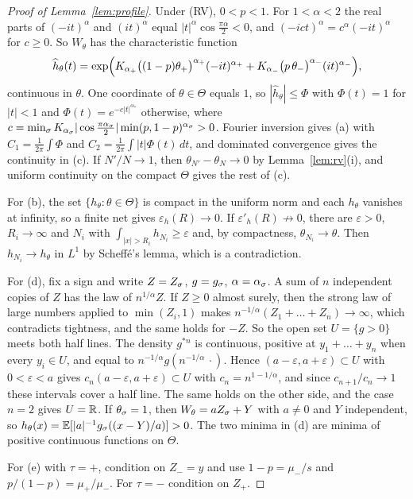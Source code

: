 \begin{proof}[Proof of Lemma~\ref{lem:profile}]
Under (RV), $0<p<1$. For $1<\alpha<2$ the real parts of $(-it)^\alpha$ and $(it)^\alpha$
equal $|t|^\alpha\cos\frac{\pi\alpha}2<0$, and $(-ict)^\alpha=c^\alpha(-it)^\alpha$ for $c\ge0$.
So $W_\theta$ has the characteristic function
\[
 \widehat h_\theta(t)=\exp\Bigl(K_{\alpha_{+}}\bigl((1-p)\theta_{+}\bigr)^{\alpha_{+}}(-it)^{\alpha_{+}}
 +K_{\alpha_{-}}\bigl(p\,\theta_{-}\bigr)^{\alpha_{-}}(it)^{\alpha_{-}}\Bigr),
\]
continuous in $\theta$. One coordinate of $\theta\in\Theta$ equals $1$, so
$|\widehat h_\theta|\le\Phi$ with $\Phi(t)=1$ for $|t|<1$ and $\Phi(t)=e^{-c|t|^{\alpha_*}}$
otherwise, where $c=\min_\sigma K_{\alpha_\sigma}|\cos\frac{\pi\alpha_\sigma}2|\min(p,1-p)^{\alpha_\sigma}>0$.
Fourier inversion gives (a) with $C_1=\frac1{2\pi}\int\Phi$ and
$C_2=\frac1{2\pi}\int|t|\Phi(t)\,dt$, and dominated convergence gives the continuity
in (c). If $N'/N\to1$, then $\theta_{N'}-\theta_N\to0$ by Lemma~\ref{lem:rv}(i), and
uniform continuity on the compact $\Theta$ gives the rest of (c).

For (b), the set $\{h_\theta:\theta\in\Theta\}$ is compact in the uniform norm and
each $h_\theta$ vanishes at infinity, so a finite net gives $\varepsilon_h(R)\to0$. If
$\varepsilon'_h(R)\not\to0$, there are $\varepsilon>0$, $R_i\to\infty$ and $N_i$ with
$\int_{|x|>R_i}h_{N_i}\ge\varepsilon$ and, by compactness, $\theta_{N_i}\to\theta$. Then
$h_{N_i}\to h_\theta$ in $L^1$ by Scheff\'e's lemma, which is a contradiction.

For (d), fix a sign and write $Z=Z_\sigma$, $g=g_\sigma$, $\alpha=\alpha_\sigma$. A sum of $n$
independent copies of $Z$ has the law of $n^{1/\alpha}Z$. If $Z\ge0$ almost surely,
then the strong law of large numbers applied to $\min(Z_i,1)$ makes
$n^{-1/\alpha}(Z_1+\dots+Z_n)\to\infty$, which contradicts tightness, and the same holds
for $-Z$. So the open set $U=\{g>0\}$ meets both half lines. The density $g^{*n}$ is
continuous, positive at $y_1+\dots+y_n$ when every $y_i\in U$, and equal to
$n^{-1/\alpha}g(n^{-1/\alpha}\,\cdot)$. Hence $(a-\varepsilon,a+\varepsilon)\subset U$ with
$0<\varepsilon<a$ gives $c_n(a-\varepsilon,a+\varepsilon)\subset U$ with
$c_n=n^{1-1/\alpha}$, and since $c_{n+1}/c_n\to1$ these intervals cover a half line. The
same holds on the other side, and the case $n=2$ gives $U=\mathbb{R}$. If $\theta_\sigma=1$, then
$W_\theta=aZ_\sigma+Y$ with $a\ne0$ and $Y$ independent, so $h_\theta(x)=\mathbb{E}[|a|^{-1}g_\sigma((x-Y)/a)]>0$.
The two minima in (d) are minima of positive continuous functions on $\Theta$.

For (e) with $\tau=\plus$, condition on $Z_\minus=y$ and use $1-p=\mu_\minus/s$ and
$p/(1-p)=\mu_\plus/\mu_\minus$. For $\tau=\minus$ condition on $Z_\plus$.
\end{proof}


